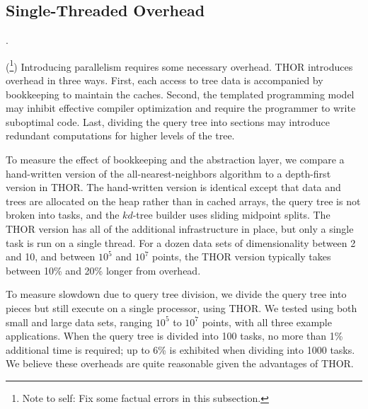 \documentclass[twoside,leqno,twocolumn]{article}
\newcommand{\authornote}[1]{(\footnote{Note to self: #1})}
\newcommand{\authorsnote}[1]{\authornote{#1}}
\newcommand{\mysub}[1]{\subsection{#1}. }
\begin{document}

\mysub{Single-Threaded Overhead}

\authorsnote{Fix some factual errors in this subsection.}
Introducing parallelism requires some necessary overhead.
THOR introduces overhead in three ways.
First, each access to tree data is accompanied by bookkeeping to maintain the caches.
Second, the templated programming model may inhibit effective compiler optimization and require the programmer to write suboptimal code.
Last, dividing the query tree into sections may introduce redundant computations for higher levels of the tree.

To measure the effect of bookkeeping and the abstraction layer, we compare a hand-written version of the all-nearest-neighbors algorithm to a depth-first version in THOR.
The hand-written version is identical except that data and trees are allocated on the heap rather than in cached arrays, the query tree is not broken into tasks, and the $kd$-tree builder uses sliding midpoint splits.
The THOR version has all of the additional infrastructure in place, but only a single task is run on a single thread.
For a dozen data sets of dimensionality between 2 and 10, and between $10^5$ and $10^7$ points, the THOR version typically takes between 10\% and 20\% longer from overhead.

To measure slowdown due to query tree division, we divide the query tree into pieces but still execute on a single processor, using THOR.
We tested using both small and large data sets, ranging $10^5$ to $10^7$ points, with all three example applications.
When the query tree is divided into 100 tasks, no more than 1\% additional time is required; up to 6\% is exhibited when dividing into 1000 tasks.
We believe these overheads are quite reasonable given the advantages of THOR.

\end{document}
